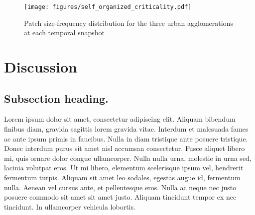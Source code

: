 \documentclass[10pt,letterpaper]{article}
\begin{document}
\begin{figure}[ht]
  \begin{adjustwidth}{-.4\textwidth}{0cm}
    \centering
    \texttt{[image: figures/self\_organized\_criticality.pdf]}
    \vspace{.5em}
    \caption[Patch size-frequency distribution]{\label{figures/self_organized_criticality.pdf}Patch size-frequency distribution for the three urban agglomerations  at each temporal snapshot}
  \end{adjustwidth}
\end{figure}





\section*{Discussion}
\subsection*{Subsection heading.}

Lorem ipsum dolor sit amet, consectetur adipiscing elit. Aliquam bibendum finibus diam, gravida sagittis lorem gravida vitae. Interdum et malesuada fames ac ante ipsum primis in faucibus. Nulla in diam tristique ante posuere tristique. Donec interdum purus sit amet nisl accumsan consectetur. Fusce aliquet libero mi, quis ornare dolor congue ullamcorper. Nulla nulla urna, molestie in urna sed, lacinia volutpat eros. Ut mi libero, elementum scelerisque ipsum vel, hendrerit fermentum turpis. Aliquam sit amet leo sodales, egestas augue id, fermentum nulla. Aenean vel cursus ante, et pellentesque eros. Nulla ac neque nec justo posuere commodo sit amet sit amet justo. Aliquam tincidunt tempor ex nec tincidunt. In ullamcorper vehicula lobortis. 
\end{document}
